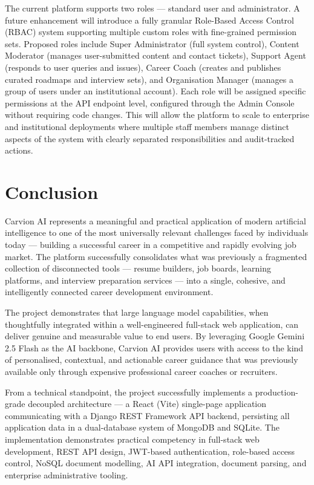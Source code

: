 \documentclass[12pt]{article}
\begin{document}
The current platform supports two roles — standard user and administrator. A future enhancement will introduce a fully granular Role-Based Access Control (RBAC) system supporting multiple custom roles with fine-grained permission sets. Proposed roles include Super Administrator (full system control), Content Moderator (manages user-submitted content and contact tickets), Support Agent (responds to user queries and issues), Career Coach (creates and publishes curated roadmaps and interview sets), and Organisation Manager (manages a group of users under an institutional account). Each role will be assigned specific permissions at the API endpoint level, configured through the Admin Console without requiring code changes. This will allow the platform to scale to enterprise and institutional deployments where multiple staff members manage distinct aspects of the system with clearly separated responsibilities and audit-tracked actions.

\clearpage
\section{Conclusion}

Carvion AI represents a meaningful and practical application of modern artificial intelligence to one of the most universally relevant challenges faced by individuals today — building a successful career in a competitive and rapidly evolving job market. The platform successfully consolidates what was previously a fragmented collection of disconnected tools — resume builders, job boards, learning platforms, and interview preparation services — into a single, cohesive, and intelligently connected career development environment.

The project demonstrates that large language model capabilities, when thoughtfully integrated within a well-engineered full-stack web application, can deliver genuine and measurable value to end users. By leveraging Google Gemini 2.5 Flash as the AI backbone, Carvion AI provides users with access to the kind of personalised, contextual, and actionable career guidance that was previously available only through expensive professional career coaches or recruiters.

From a technical standpoint, the project successfully implements a production-grade decoupled architecture — a React (Vite) single-page application communicating with a Django REST Framework API backend, persisting all application data in a dual-database system of MongoDB and SQLite. The implementation demonstrates practical competency in full-stack web development, REST API design, JWT-based authentication, role-based access control, NoSQL document modelling, AI API integration, document parsing, and enterprise administrative tooling.
\end{document}
